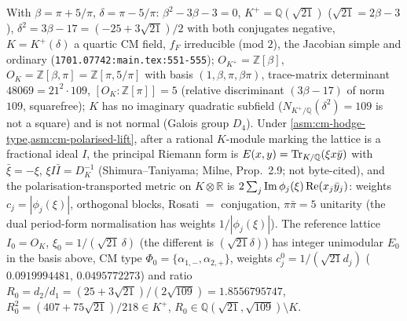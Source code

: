 \begin{theorem}
\label{thm:genus-two-cm-reference}
With $\beta = \pi+5/\pi$, $\delta = \pi-5/\pi$: $\beta^2-3\beta-3 = 0$, $K^+ = \mathbb Q(\sqrt{21})$ ($\sqrt{21} = 2\beta-3$),
$\delta^2 = 3\beta-17 = (-25+3\sqrt{21})/2$ with both conjugates negative, $K = K^+(\delta)$ a quartic CM field, $f_F$ irreducible
(mod $2$), the Jacobian simple and ordinary (\texttt{1701.07742:main.tex:551-555}); $O_{K^+} = \mathbb Z[\beta]$,
$O_K = \mathbb Z[\beta,\pi] = \mathbb Z[\pi,5/\pi]$ with basis $(1,\beta,\pi,\beta\pi)$, trace-matrix determinant $48069 = 21^2\cdot109$,
$[O_K:\mathbb Z[\pi]] = 5$ (relative discriminant $(3\beta-17)$ of norm $109$, squarefree); $K$ has no imaginary quadratic
subfield ($N_{K^+/\mathbb Q}(\delta^2) = 109$ is not a square) and is not normal (Galois group $D_4$). Under
\cref{asm:cm-hodge-type,asm:cm-polarised-lift}, after a rational $K$-module marking the lattice is a fractional ideal $I$, the
principal Riemann form is $E(x,y) = \operatorname{Tr}_{K/\mathbb Q}(\xi x\bar y)$ with $\bar\xi = -\xi$, $\xi I\bar I = D_K^{-1}$
(Shimura--Taniyama; Milne, Prop.\ 2.9; not byte-cited), and the polarisation-transported metric on $K\otimes\mathbb R$ is
$2\sum_j\operatorname{Im}\phi_j(\xi)\operatorname{Re}(x_j\bar y_j)$: weights $c_j = |\phi_j(\xi)|$, orthogonal blocks, Rosati $=$ conjugation, $\pi\bar\pi = 5$
unitarity (the dual period-form normalisation has weights $1/|\phi_j(\xi)|$). The reference lattice $I_0 = O_K$,
$\xi_0 = 1/(\sqrt{21}\,\delta)$ (the different is $(\sqrt{21}\delta)$) has integer unimodular $E_0$ in the basis above,
CM type $\Phi_0 = \{\alpha_{1,-},\alpha_{2,+}\}$, weights $c^0_j = 1/(\sqrt{21}d_j)$ ($0.0919994481$, $0.0495772273$) and ratio
$R_0 = d_2/d_1 = (25+3\sqrt{21})/(2\sqrt{109}) = 1.8556795747$, $R_0^2 = (407+75\sqrt{21})/218\in K^+$, $R_0\in\mathbb Q(\sqrt{21},\sqrt{109})\setminus K$.
\end{theorem}

